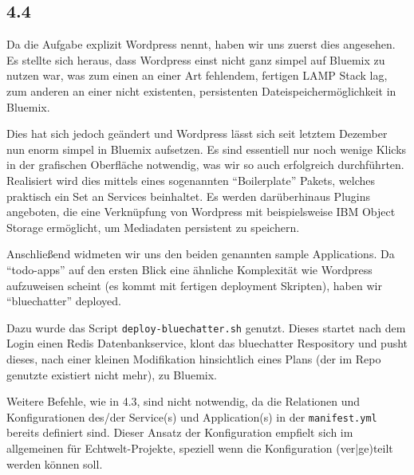 
\subsection{4.4}

Da die Aufgabe explizit Wordpress nennt, haben wir uns zuerst dies angesehen.
Es stellte sich heraus, dass Wordpress einst nicht ganz simpel auf Bluemix zu nutzen war, was zum einen an einer Art fehlendem, fertigen LAMP Stack lag, zum anderen an einer nicht existenten, persistenten Dateispeichermöglichkeit in Bluemix.

Dies hat sich jedoch geändert und Wordpress lässt sich seit letztem Dezember nun enorm simpel in Bluemix aufsetzen.
Es sind essentiell nur noch wenige Klicks in der grafischen Oberfläche notwendig, was wir so auch erfolgreich durchführten.
Realisiert wird dies mittels eines sogenannten \enquote{Boilerplate} Pakets, welches praktisch ein Set an Services beinhaltet.
Es werden darüberhinaus Plugins angeboten, die eine Verknüpfung von Wordpress mit beispielsweise IBM Object Storage ermöglicht, um Mediadaten persistent zu speichern.

Anschließend widmeten wir uns den beiden genannten sample Applications.
Da \enquote{todo-apps} auf den ersten Blick eine ähnliche Komplexität wie Wordpress aufzuweisen scheint (es kommt mit fertigen deployment Skripten), haben wir \enquote{bluechatter} deployed.

Dazu wurde das Script \texttt{deploy-bluechatter.sh} genutzt.
Dieses startet nach dem Login einen Redis Datenbankservice, klont das bluechatter Respository und
pusht dieses, nach einer kleinen Modifikation hinsichtlich eines Plans (der im Repo genutzte existiert nicht mehr), zu Bluemix.

Weitere Befehle, wie in 4.3, sind nicht notwendig, da die Relationen und Konfigurationen des/der Service(s) und Application(s) in der \texttt{manifest.yml} bereits definiert sind.
Dieser Ansatz der Konfiguration empfielt sich im allgemeinen für Echtwelt-Projekte, speziell wenn die Konfiguration (ver|ge)teilt werden können soll.
